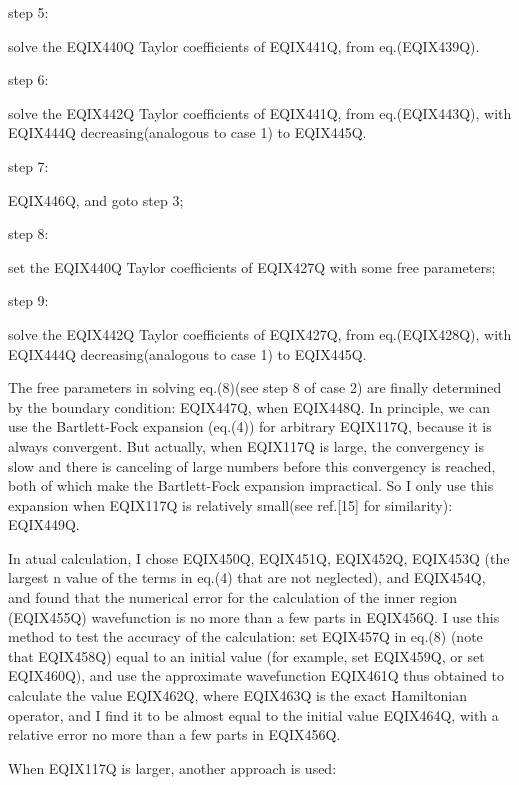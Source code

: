 \vspace{4mm}
\noindent step 5: \parbox[t]{146mm}
{solve the EQIX440Q Taylor coefficients of EQIX441Q, from
eq.(EQIX439Q).}

\vspace{1.5mm}
\noindent step 6: \parbox[t]{146mm}
{solve the EQIX442Q Taylor coefficients of EQIX441Q, from
eq.(EQIX443Q), with EQIX444Q decreasing(analogous to case 1) to EQIX445Q.}

\vspace{4mm}
\noindent step 7: \parbox[t]{146mm}
{EQIX446Q, and goto step 3;}

\vspace{1.5mm}
\noindent step 8: \parbox[t]{146mm}
{set the EQIX440Q Taylor coefficients of EQIX427Q with some free
parameters;}

\vspace{1.7mm}
\noindent step 9: \parbox[t]{146mm}
{solve the EQIX442Q Taylor coefficients of EQIX427Q,
from eq.(EQIX428Q), with EQIX444Q decreasing(analogous to case 1) to EQIX445Q.}

\vspace{4mm}
The free parameters in solving eq.(8)(see step 8 of case 2) are
finally determined by the boundary condition: EQIX447Q,
when EQIX448Q. In principle, we can use the Bartlett-Fock expansion
(eq.(4)) for arbitrary EQIX117Q, because it is always convergent. But actually,
when EQIX117Q is large, the convergency is slow and there is canceling of large
numbers before this convergency is reached, both of which make
the Bartlett-Fock expansion impractical. So I only use this expansion when
EQIX117Q is relatively small(see ref.[15] for similarity):
EQIX449Q.

In atual calculation,
I chose EQIX450Q, EQIX451Q, EQIX452Q, EQIX453Q (the largest n value
of the terms in eq.(4) that are not neglected),
and EQIX454Q, and found that
the numerical error for the calculation
of the inner region (EQIX455Q)
wavefunction is no more than a few parts in EQIX456Q.
I use this method to test the accuracy of the calculation: set EQIX457Q in
eq.(8) (note that EQIX458Q) equal to an initial value
(for example, set EQIX459Q, or set EQIX460Q),
and use the approximate wavefunction EQIX461Q
thus obtained to calculate the value
EQIX462Q, where EQIX463Q is the exact Hamiltonian operator,
and I find it to be almost equal to the initial value EQIX464Q,
with a relative error no more than a few parts in EQIX456Q.

When EQIX117Q is larger, another approach is used:

